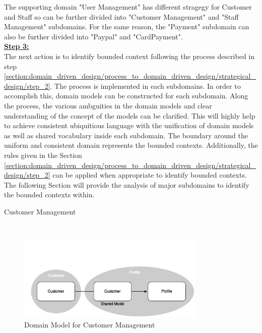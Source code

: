 The supporting domain "User Management" has different stragegy for Customer and Staff so can be further divided into "Customer Management" and "Staff Management" subdomains. For the same reason, the "Payment" subdomain can also be further divided into "Paypal" and "CardPayment".
\\
\textbf{\underline{Step 3:}}
\\
The next action is to identify bounded context following the process described in step \ref{section:domain_driven_design/process_to_domain_driven_design/strategical_design/step_2}. The process is implemented in each subdomains. In order to accomplish this, domain models can be constructed for each subdomain. Along the process, the various ambguities in the domain models and clear understanding of the concept of the models can be clarified. This will highly help to achieve consistent ubiquitious language with the unification of domain models as well as shared vocabulary inside each subdomain. The boundary around the uniform and consistent domain represents the bounded contexts. Additionally, the rules given in the Section \ref{section:domain_driven_design/process_to_domain_driven_design/strategical_design/step_2} can be applied when appropriate to identify bounded contexts.
The following Section will provide the analysis of major subdomains to identify the bounded contexts within.\\
\begin{shaded} Customer Management \end{shaded}
\\
\begin{figure}[H]
\begin{center}
\includegraphics[width=0.8\textwidth]{figures/domain-driven-design-two}
\caption{Domain Model for Customer Management}
\label{fig:domain_driven_design/example_scenario/subdomains/Customer}
\end{center}
\end{figure}
\\
